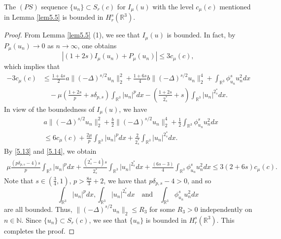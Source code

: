 \begin{lemma}\label{lem5.6} 
The $(PS)$ sequence $\{u_n\} \subset S_{r}(c)$ for $I_\mu(u)$ with the level 
$c_\mu(c)$ mentioned in Lemma \ref{lem5.5} is bounded in $H^s_r(\mathbb{R}^3)$.
\end{lemma}

\begin{proof}  
From Lemma  \ref{lem5.5} (1), we see that $I_\mu(u)$ is bounded. 
In fact, by $P_\mu(u_n)\to 0$ as $n\to \infty$, one obtains
$$
|(1+2s)I_\mu(u_n)+P_\mu(u_n)|\leq 3c_\mu(c),
$$
which implies that
\begin{equation}\label{5.13}
\begin{split}
-3c_\mu(c)&\leq \frac{1+4s}{2}a\|(-\Delta)^{s/2}u_n\|^2_2+\frac{1+6s}{4}b
\|(-\Delta)^{s/2}u_n\|^4_2+\int_{\mathbb{R}^3}\phi^s_{u_n}u^2_ndx\\
&\quad -\mu(\frac{1+2s}{p}+s\delta_{p,s})\int_{\mathbb{R}^3}|u_n|^pdx
 -(\frac{1+2s}{2^*_s}+s)\int_{\mathbb{R}^3}|u_n|^{2^*_s}dx.
\end{split}
\end{equation}
In view of the boundedness of $I_\mu(u)$, we have
\begin{equation}\label{5.14}
\begin{split}
&a\|(-\Delta)^{s/2}u_n\|^2_2+\frac{b}{2}\|(-\Delta)^{s/2}u_n\|^4_2
 +\frac{1}{2}\int_{\mathbb{R}^3}\phi^s_{u_n}u^2_ndx\\
&\leq 6c_\mu(c)+\frac{2\mu}{p}\int_{\mathbb{R}^3}|u_n|^pdx
 +\frac{2}{2^*_s}\int_{\mathbb{R}^3}|u_n|^{2^*_s}dx.
\end{split}
\end{equation}
By \eqref{5.13} and \eqref{5.14}, we obtain
\begin{align*} %
\mu \frac{(p\delta_{p,s}-4)s}{p}\int_{\mathbb{R}^3}|u_n|^pdx
+\frac{(2^*_s-4)s}{2^*_s}\int_{\mathbb{R}^3}|u_n|^{2^*_s}dx
+\frac{(6s-3)}{4}\int_{\mathbb{R}^3}\phi^s_{u_n}u^2_ndx\leq 3(2+6s)c_\mu(c).
\end{align*}
Note that $s\in(\frac{3}{4}, 1)$, $p>\frac{8s}{3}+2$, we have that 
$p\delta_{p,s}-4>0$, and so
$$
\int_{\mathbb{R}^3}|u_n|^pdx, \int_{\mathbb{R}^3}|u_n|^{2^*_s}dx 
\quad\text{and}\quad
\int_{\mathbb{R}^3}\phi^s_{u_n}u^2_ndx 
$$
are all bounded. Thus, $\|(-\Delta)^{s/2}u_n\|_2\leq R_3$ for some $R_3>0$ 
independently on $n\in \mathbb{N}$. Since $\{u_n\}\subset S_{r}(c)$, we see that 
$\{u_n\}$ is bounded in $H^s_r(\mathbb{R}^3)$.  
This completes the proof.
\end{proof}

